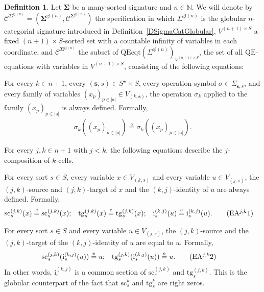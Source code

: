 \documentclass[a4paper, reqno
]{amsart}
\newcommand{\sig}[1]{\mathbf{#1}}             %
\newcommand{\spec}[1]{\boldsymbol{\mathcal{#1}}} %
\newcommand{\eeq}{\overset{\mathrm e}{=}}      %
\newcommand{\QE}{\mathrm{QE}}
\newcommand{\gl}{\mathrm{gl}}                %
\newcommand{\src}{\mathrm{sc}}
\newcommand{\tgt}{\mathrm{tg}}
\theoremstyle{plain}
\theoremstyle{definition}
\newtheorem{definition}[theorem]{Definition}
\begin{document}
\begin{definition}\label{DSpecGlobular}
Let $\sig{\Sigma}$ be a many-sorted signature and $n\in\mathbb{N}$.
We will denote by $\spec{C}^{\sig{\Sigma}^{\gl(n)}}=(\sig{\Sigma}^{\gl(n)},\mathcal{C}^{\sig{\Sigma}^{\gl(n)}})$ the specification in which $\Sigma^{\gl(n)}$ is the globular $n$-categorial signature introduced in Definition~\ref{DSigmaCatGlobular}, $V^{(n+1)\times S}$ a fixed $(n+1)\times S$-sorted set with a countable infinity of variables in each coordinate, and $\mathcal{C}^{\sig{\Sigma}^{\gl(n)}}$ the subset of $\mathrm{QEeqt}(\Sigma^{\gl(n)})_{V^{(n+1)\times S}}$, the set of all $\QE$-equations with variables in $V^{(n+1)\times S}$, consisting of the following equations:

For every $k\in n+1$, every $(\mathbf{s},s)\in S^{\star}\times S$, every operation symbol $\sigma\in \Sigma_{\mathbf{s},s}$, and every family of variables $(x_{p})_{p\in \lvert\mathbf{s}\rvert}\in V_{(k,\mathbf{s})}$, the operation $\sigma_{k}$ applied to the family $(x_{p})_{p\in \lvert\mathbf{s}\rvert}$ is always defined.
Formally,
\begin{align*}
\sigma_{k}((x_{p})_{p\in \lvert\mathbf{s}\rvert})\eeq\sigma_{k}((x_{p})_{p\in \lvert\mathbf{s}\rvert}).\label{AGlobularA0}\tag{EA0}
\end{align*}

For every $j,k\in n+1$ with $j<k$, the following equations describe the $j$-composition of $k$-cells.

For every sort $s\in S$, every variable $x\in V_{(k,s)}$ and every variable $u\in V_{(j,s)}$, the $(j,k)$-source and $(j,k)$-target of $x$ and the $(k,j)$-identity of $u$ are always defined.
Formally,
\begin{align*}
\src^{(j,k)}_{s}(x)&\eeq\src^{(j,k)}_{s}(x);
&
\tgt^{(j,k)}_{s}(x)&\eeq\tgt^{(j,k)}_{s}(x);
&
\mathrm{i}^{(k,j)}_{s}(u)&\eeq\mathrm{i}^{(k,j)}_{s}(u).\label{AGlobularAjk1}\tag{EA$^{j,k}$1}
\end{align*}

For every sort $s\in S$ and every variable $u\in V_{(j,s)}$, the $(j,k)$-source and the $(j,k)$-target of the $(k,j)$-identity of $u$ are equal to $u$.
Formally,
\begin{align*}
\src^{(j,k)}_{s}(\mathrm{i}^{(k,j)}_{s}(u))&\eeq u;
&
\tgt^{(j,k)}_{s}(\mathrm{i}^{(k,j)}_{s}(u))&\eeq u.\label{AGlobularAjk2}\tag{EA$^{j,k}$2}
\end{align*}
In other words, $\mathrm{i}^{(k,j)}_{s}$ is a common section of $\src^{(j,k)}_{s}$ and $\tgt^{(j,k)}_{s}$.
This is the globular counterpart of the fact that $\src^{k}_{s}$ and $\tgt^{k}_{s}$ are right zeros.


\end{definition}
\end{document}
